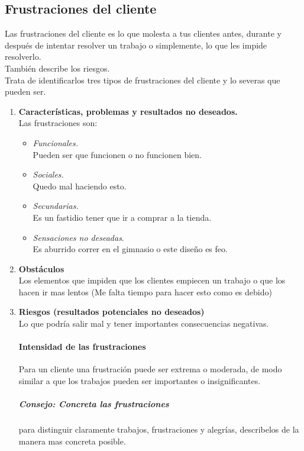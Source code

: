 \documentclass[11pt]{book}
\begin{document}
\subsection{Frustraciones del cliente}
Las  frustraciones del cliente es lo que molesta a tus clientes antes, durante y después de intentar resolver un trabajo o simplemente, lo que les impide resolverlo.\\
También describe los riesgos.\\
Trata de identificarlos tres tipos de frustraciones del cliente y lo severas que pueden ser.
\begin{enumerate}
\item \textbf{ Características, problemas y resultados no deseados.}\\
Las frustraciones son:
\begin{itemize}
\item \textit{Funcionales.}\\
Pueden ser que funcionen o no funcionen bien.
\item \textit{Sociales.}\\
Quedo mal haciendo esto.
\item \textit{Secundarias.}\\
Es un fastidio tener que ir a comprar a la tienda.
\item \textit{Sensaciones no deseadas}.\\
Es aburrido correr en el gimnasio o este diseño es feo.
\end{itemize}
\item \textbf{ Obstáculos }\\
Los elementos que impiden que los clientes empiecen un trabajo o que los hacen ir mas lentos (Me falta tiempo para hacer esto como es debido)
\item \textbf{ Riesgos (resultados potenciales no deseados) }\\
Lo que podría salir mal y tener importantes consecuencias negativas.
\paragraph{Intensidad de las frustraciones}
Para un cliente una frustración puede ser extrema o moderada, de modo similar a que los trabajos pueden ser importantes o insignificantes.
\subparagraph{Consejo: Concreta las frustraciones}
para distinguir claramente trabajos, frustraciones y alegrías, describelos de la manera mas concreta posible.

\end{enumerate}
\end{document}
